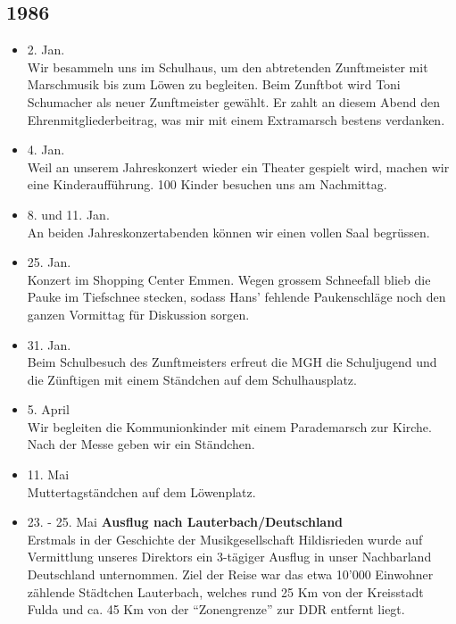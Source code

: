 \subsection{1986}

\begin{history}


    \begin{itemize}

        \item 2. Jan.\\
              Wir besammeln uns im Schulhaus, um den abtretenden Zunftmeister mit
              Marschmusik bis zum Löwen zu begleiten. Beim Zunftbot wird Toni
              Schumacher als neuer Zunftmeister gewählt. Er zahlt an diesem Abend den
              Ehrenmitgliederbeitrag, was mir mit einem Extramarsch bestens verdanken.

        \item 4. Jan.\\
              Weil an unserem Jahreskonzert wieder ein Theater gespielt wird, machen
              wir eine Kinderaufführung. 100 Kinder besuchen uns am Nachmittag.

        \item 8. und 11. Jan.\\
              An beiden Jahreskonzertabenden können wir einen vollen Saal begrüssen.

        \item 25. Jan.\\
              Konzert im Shopping Center Emmen. Wegen grossem Schneefall blieb die
              Pauke im Tiefschnee stecken, sodass Hans' fehlende Paukenschläge noch
              den ganzen Vormittag für Diskussion sorgen.

        \item 31. Jan.\\
              Beim Schulbesuch des Zunftmeisters erfreut die MGH die Schuljugend und
              die Zünftigen mit einem Ständchen auf dem Schulhausplatz.

        \item 5. April\\
              Wir begleiten die Kommunionkinder mit einem Parademarsch zur Kirche.
              Nach der Messe geben wir ein Ständchen.

        \item 11. Mai\\
              Muttertagständchen auf dem Löwenplatz.

        \item 23. - 25. Mai \textbf{Ausflug nach Lauterbach/Deutschland}\\
              Erstmals in der Geschichte der Musikgesellschaft Hildisrieden wurde auf
              Vermittlung unseres Direktors ein 3-tägiger Ausflug in unser Nachbarland
              Deutschland unternommen. Ziel der Reise war das etwa 10'000 Einwohner
              zählende Städtchen Lauterbach, welches rund 25 Km von der Kreisstadt
              Fulda und ca. 45 Km von der \enquote{Zonengrenze} zur DDR entfernt
              liegt.


\end{itemize}
\end{history}
